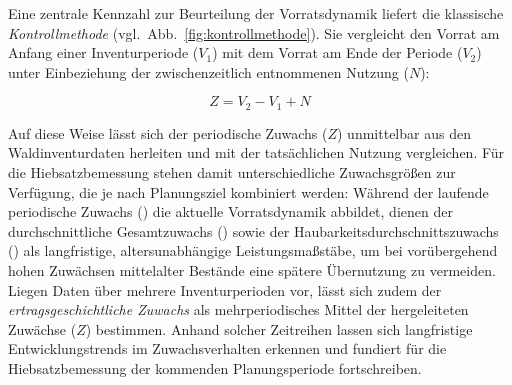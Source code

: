 \documentclass[twocolumn, paper=a4, fontsize=10pt]{scrartcl}
\begin{document}
Eine zentrale Kennzahl zur Beurteilung der Vorratsdynamik liefert die klassische \emph{Kontrollmethode} (vgl.\ Abb.~\ref{fig:kontrollmethode}). Sie vergleicht den Vorrat am Anfang einer Inventurperiode ($V_1$) mit dem Vorrat am Ende der Periode ($V_2$) unter Einbeziehung der zwischenzeitlich entnommenen Nutzung ($N$):

\begin{equation}
    \label{eq:kontrollmethode}
    Z = V_2 - V_1 + N
\end{equation}

Auf diese Weise lässt sich der periodische Zuwachs ($Z$) unmittelbar aus den Waldinventurdaten herleiten und mit der tatsächlichen Nutzung vergleichen. Für die Hiebsatzbemessung stehen damit unterschiedliche Zuwachsgrößen zur Verfügung, die je nach Planungsziel kombiniert werden: Während der laufende periodische Zuwachs () die aktuelle Vorratsdynamik abbildet, dienen der durchschnittliche Gesamtzuwachs () sowie der Haubarkeitsdurchschnittszuwachs () als langfristige, altersunabhängige Leistungsmaßstäbe, um bei vorübergehend hohen Zuwächsen mittelalter Bestände eine spätere Übernutzung zu vermeiden. Liegen Daten über mehrere Inventurperioden vor, lässt sich zudem der \emph{ertragsgeschichtliche Zuwachs} als mehrperiodisches Mittel der hergeleiteten Zuwächse ($Z$) bestimmen. Anhand solcher Zeitreihen lassen sich langfristige Entwicklungstrends im Zuwachsverhalten erkennen und fundiert für die Hiebsatzbemessung der kommenden Planungsperiode fortschreiben.
\end{document}
